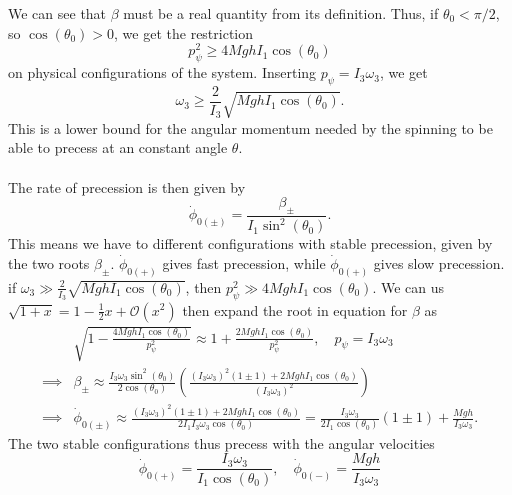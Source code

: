 \documentclass{article}
\begin{document}
        We can see that $\beta$ must be a real quantity from its definition. Thus, if $\theta_0 < \pi / 2$, so $\cos(\theta_0) > 0$, we get the restriction
        \begin{equation*}
            p_\psi^2 \geq 4 M g h I_1 \cos(\theta_0)
        \end{equation*}
        on physical configurations of the system. Inserting $p_\psi = I_3 \omega_3$, we get
        \begin{equation*}
            \omega_3 \geq \frac{2}{I_3} \sqrt{MghI_1 \cos(\theta_0)}.
        \end{equation*}
        This is a lower bound for the angular momentum needed by the spinning to be able to precess at an constant angle $\theta$. \\ \\
        The rate of precession is then given by
        \begin{equation*}
            \dot \phi_{0(\pm)} = \frac{\beta_\pm}{I_1 \sin^2(\theta_0)}.
        \end{equation*}
        This means we have to different configurations with stable precession, given by the two roots $\beta_\pm$. $\dot \phi_{0(+)}$ gives fast precession, while $\dot \phi_{0(+)}$ gives slow precession. if $\omega_3 \gg \frac{2}{I_3}\sqrt{MghI_1 \cos(\theta_0) }$, then $p_\psi^2 \gg 4 M g h I_1 \cos(\theta_0)$. We can us $\sqrt{1 + x} = 1 - \frac{1}{2} x + \mathcal{O}(x^2)$ then expand the root in equation for $\beta$ as
        \begin{align*}
            & \sqrt{1 - \frac{4 M g h I_1 \cos(\theta_0)}{p_\psi^2}} \approx 1 +\frac{2 M g h I_1 \cos(\theta_0)}{p_\psi^2}, \quad p_\psi = I_3 \omega_3  \\
            \implies &\beta_\pm \approx \frac{I_3 \omega_3 \sin^2(\theta_0)}{2 \cos(\theta_0)} \left(\frac{ (I_3 \omega_3 )^2 (1\pm 1) + 2 M g h I_1 \cos(\theta_0)}{(I_3 \omega_3)^2} \right) \\
            \implies & \dot \phi_{0(\pm)} \approx \frac{ (I_3 \omega_3 )^2(1\pm 1) + 2 M g h I_1 \cos(\theta_0)}{2 I_1 I_3 \omega_3 \cos(\theta_0)} = \frac{I_3 \omega_3}{2 I_1 \cos(\theta_0)} (1\pm 1) + \frac{Mgh}{I_3 \omega_3}.
        \end{align*}
        The two stable configurations thus precess with the angular velocities
        \begin{equation*}
            \dot \phi_{0(+)} = \frac{I_3 \omega_3}{I_1 \cos(\theta_0)}, \quad \dot \phi_{0(-)} = \frac{Mgh}{I_3 \omega_3}
        \end{equation*}
\end{document}
